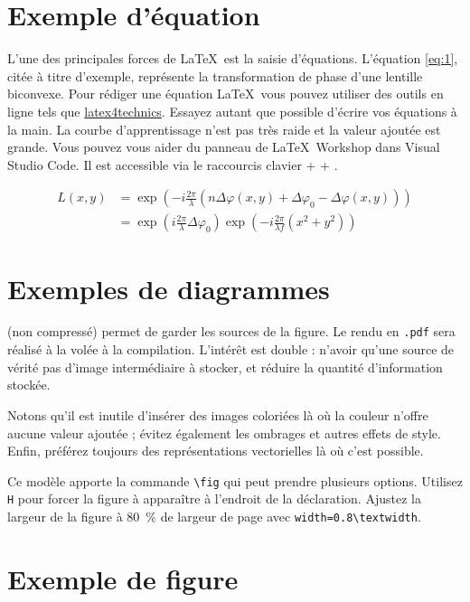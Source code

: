 \section{Exemple d'équation}
L'une des principales forces de \LaTeX~est la saisie d'équations. L'équation \ref{eq:1}, citée à titre d'exemple, représente la transformation de phase d'une lentille biconvexe. Pour rédiger une équation \LaTeX~vous pouvez utiliser des outils en ligne tels que \href{https://www.latex4technics.com/}{latex4technics}. Essayez autant que possible d'écrire vos équations à la main. La courbe d'apprentissage n'est pas très raide et la valeur ajoutée est grande. Vous pouvez vous aider du panneau de \LaTeX~Workshop dans Visual Studio Code. Il est accessible via le raccourcis clavier  +  + .

\begin{equation} \label{eq:1}
    \begin{split}
        L(x,y) &= \exp\left( - i\frac{{2\pi }}{\lambda }\left( {n\Delta \varphi (x,y) + \Delta {\varphi _0} - \Delta \varphi (x,y)} \right)\right)\\
        &= {\exp\left({i\frac{{2\pi }}{\lambda }\Delta {\varphi _0}}\right)}{\exp\left({ - i\frac{{2\pi }}{{\lambda f}}({x^2} + {y^2})}\right)}
    \end{split}
\end{equation}

\section{Exemples de diagrammes}
 (non compressé) permet de garder les sources de la figure. Le rendu en \texttt{.pdf} sera réalisé à la volée à la compilation. L'intérêt est double : n'avoir qu'une source de vérité \cad pas d'image intermédiaire à stocker, et réduire la quantité d'information stockée.

Notons qu'il est inutile d'insérer des images coloriées là où la couleur n'offre aucune valeur ajoutée ; évitez également les ombrages et autres effets de style. Enfin, préférez toujours des représentations vectorielles là où c'est possible.


Ce modèle apporte la commande \verb!\fig! qui peut prendre plusieurs options. Utilisez \verb!H! pour forcer la figure à apparaître à l'endroit de la déclaration. Ajustez la largeur de la figure à \SI{80}{\percent} de largeur de page avec \verb!width=0.8\textwidth!.

\section{Exemple de figure}

